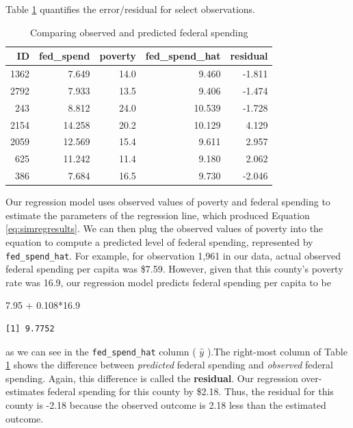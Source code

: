 \documentclass[
]{book}
\makeatletter
\newenvironment{Shaded}{\begin{snugshade}}{\end{snugshade}}
\newcommand{\FloatTok}[1]{\textcolor[rgb]{0.06,0.06,0.06}{#1}}
\newcommand{\SpecialCharTok}[1]{\textcolor[rgb]{0,0,0}{#1}}
\newenvironment{kframe}{%
\medskip{}
\setlength{\fboxsep}{.8em}
 \def\at@end@of@kframe{}%
 \ifinner\ifhmode%
  \def\at@end@of@kframe{\end{minipage}}%
  \begin{minipage}{\columnwidth}%
 \fi\fi%
 \def\FrameCommand##1{\hskip\@totalleftmargin \hskip-\fboxsep
 \colorbox{shadecolor}{##1}\hskip-\fboxsep
     \hskip-\linewidth \hskip-\@totalleftmargin \hskip\columnwidth}%
 \MakeFramed {\advance\hsize-\width
   \@totalleftmargin\z@ \linewidth\hsize
   \@setminipage}}%
 {\par\unskip\endMakeFramed%
 \at@end@of@kframe}
\renewenvironment{Shaded}{\begin{kframe}}{\end{kframe}}
\makeatother
\begin{document}
Table \ref{tab:simregexresid} quantifies the error/residual for select observations.

\begin{table}

\caption{\label{tab:simregexresid}Comparing observed and predicted federal spending}
\centering
\begin{tabular}[t]{r|r|r|r|r}
\hline
ID & fed\_spend & poverty & fed\_spend\_hat & residual\\
\hline
1362 & 7.649 & 14.0 & 9.460 & -1.811\\
\hline
2792 & 7.933 & 13.5 & 9.406 & -1.474\\
\hline
243 & 8.812 & 24.0 & 10.539 & -1.728\\
\hline
2154 & 14.258 & 20.2 & 10.129 & 4.129\\
\hline
2059 & 12.569 & 15.4 & 9.611 & 2.957\\
\hline
625 & 11.242 & 11.4 & 9.180 & 2.062\\
\hline
386 & 7.684 & 16.5 & 9.730 & -2.046\\
\hline
\end{tabular}
\end{table}

Our regression model uses observed values of poverty and federal spending to estimate the parameters of the regression line, which produced Equation \eqref{eq:simregresults}. We can then plug the observed values of poverty into the equation to compute a predicted level of federal spending, represented by \texttt{fed\_spend\_hat}. For example, for observation 1,961 in our data, actual observed federal spending per capita was \$7.59. However, given that this county's poverty rate was 16.9, our regression model predicts federal spending per capita to be

\begin{Shaded}
\begin{Highlighting}[]
\FloatTok{7.95} \SpecialCharTok{+} \FloatTok{0.108}\SpecialCharTok{*}\FloatTok{16.9}
\end{Highlighting}
\end{Shaded}

\begin{verbatim}
[1] 9.7752
\end{verbatim}

as we can see in the \texttt{fed\_spend\_hat} column ( \(\hat{y}\) ).The right-most column of Table \ref{tab:simregexresid} shows the difference between \emph{predicted} federal spending and \emph{observed} federal spending. Again, this difference is called the \textbf{residual}. Our regression over-estimates federal spending for this county by \$2.18. Thus, the residual for this county is -2.18 because the observed outcome is 2.18 less than the estimated outcome.
\end{document}
